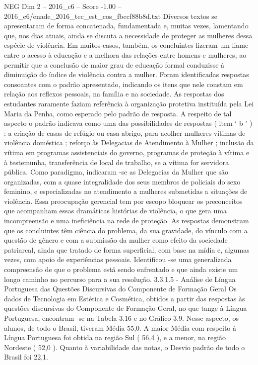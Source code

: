 \begin{textsample}{NEG Dim 2 – 2016\_c6 – Score -1.00 – 2016\_c6/enade\_2016\_tec\_est\_cos\_fbccf88b8d.txt}
Diversos textos se apresentaram de forma concatenada, fundamentada e, muitas vezes, lamentando que, nos dias atuais, ainda se discuta a necessidade de proteger as mulheres dessa espécie de violência.
Em muitos casos, também, os concluintes fizeram um liame entre o acesso à educação e a melhora das relações entre homens e mulheres, ao permitir que a conclusão de maior grau de educação formal conduzisse à diminuição do índice de violência contra a mulher.
Foram identificadas respostas consoantes com o padrão apresentado, indicando os itens que nele constam em relação aos reflexos pessoais, na família e na sociedade.
As respostas dos estudantes raramente faziam referência à organização protetiva instituída pela Lei Maria da Penha, como esperado pelo padrão de resposta.
A respeito de tal aspecto o padrão indicava como uma das possibilidades de respostas ( item ‘ b ’ ) : a criação de casas de refúgio ou casa-abrigo, para acolher mulheres vítimas de violência doméstica ; reforço às Delegacias de Atendimento à Mulher ; inclusão da vítima em programas assistenciais do governo, programas de proteção à vítima e à testemunha, transferência de local de trabalho, se a vítima for servidora pública.
Como paradigma, indicaram -se as Delegacias da Mulher que são organizadas, com a quase integralidade dos seus membros de policiais do sexo feminino, e especializadas no atendimento a mulheres submetidas a situações de violência.
Essa preocupação gerencial tem por escopo bloquear os preconceitos que acompanham essas dramáticas histórias de violência, o que gera uma incompreensão e uma ineficiência na rede de proteção.
As respostas demonstram que os concluintes têm ciência do problema, da sua gravidade, do vínculo com a questão de gênero e com a submissão da mulher como efeito da sociedade patriarcal, ainda que tratado de forma superficial, com base na mídia e, algumas vezes, com apoio de experiências pessoais.
Identificou -se uma generalizada compreensão de que o problema está sendo enfrentado e que ainda existe um longo caminho no percurso para a sua resolução. 3.3.1.5 - Análise de Língua Portuguesa das Questões Discursivas do Componente de Formação Geral Os dados de Tecnologia em Estética e Cosmética, obtidos a partir das respostas às questões discursivas do Componente de Formação Geral, no que tange à Língua Portuguesa, encontram -se na Tabela 3.16 e no Gráfico 3.9.
Nesse aspecto, os alunos, de todo o Brasil, tiveram Média 55,0.
A maior Média com respeito à Língua Portuguesa foi obtida na região Sul ( 56,4 ), e a menor, na região Nordeste ( 52,0 ).
Quanto à variabilidade das notas, o Desvio padrão de todo o Brasil foi 22,1.

\end{textsample}
